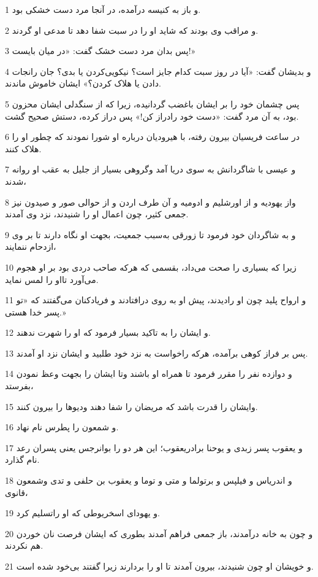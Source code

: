 \par 1 و باز به کنیسه درآمده، در آنجا مرد دست خشکی بود.
\par 2 و مراقب وی بودند که شاید او را در سبت شفا دهد تا مدعی او گردند.
\par 3 پس بدان مرد دست خشک گفت: «در میان بایست!»
\par 4 و بدیشان گفت: «آیا در روز سبت کدام جایز است؟ نیکویی‌کردن یا بدی؟ جان رانجات دادن یا هلاک کردن؟» ایشان خاموش ماندند.
\par 5 پس چشمان خود را بر ایشان باغضب گردانیده، زیرا که از سنگدلی ایشان محزون بود، به آن مرد گفت: «دست خود رادراز کن!» پس دراز کرده، دستش صحیح گشت.
\par 6 در ساعت فریسیان بیرون رفته، با هیرودیان درباره او شورا نمودند که چطور او را هلاک کنند.
\par 7 و عیسی با شاگردانش به سوی دریا آمد وگروهی بسیار از جلیل به عقب او روانه شدند،
\par 8 واز یهودیه و از اورشلیم و ادومیه و آن طرف اردن و از حوالی صور و صیدون نیز جمعی کثیر، چون اعمال او را شنیدند، نزد وی آمدند.
\par 9 و به شاگردان خود فرمود تا زورقی به‌سبب جمعیت، بجهت او نگاه دارند تا بر وی ازدحام ننمایند،
\par 10 زیرا که بسیاری را صحت می‌داد، بقسمی که هر‌که صاحب دردی بود بر او هجوم می‌آورد تااو را لمس نماید.
\par 11 و ارواح پلید چون او رادیدند، پیش او به روی در‌افتادند و فریادکنان می‌گفتند که «تو پسر خدا هستی.»
\par 12 و ایشان را به تاکید بسیار فرمود که او را شهرت ندهند.
\par 13 پس بر فراز کوهی برآمده، هر‌که راخواست به نزد خود طلبید و ایشان نزد او آمدند.
\par 14 و دوازده نفر را مقرر فرمود تا همراه او باشند وتا ایشان را بجهت وعظ نمودن بفرستد،
\par 15 وایشان را قدرت باشد که مریضان را شفا دهند ودیوها را بیرون کنند.
\par 16 و شمعون را پطرس نام نهاد.
\par 17 و یعقوب پسر زبدی و یوحنا برادریعقوب؛ این هر دو را بوانرجس یعنی پسران رعد نام گذارد.
\par 18 و اندریاس و فیلپس و برتولما و متی و توما و یعقوب بن حلفی و تدی وشمعون قانوی،
\par 19 و یهودای اسخریوطی که او راتسلیم کرد.
\par 20 و چون به خانه درآمدند، باز جمعی فراهم آمدند بطوری که ایشان فرصت نان خوردن هم نکردند.
\par 21 و خویشان او چون شنیدند، بیرون آمدند تا او را بردارند زیرا گفتند بی‌خود شده است.
